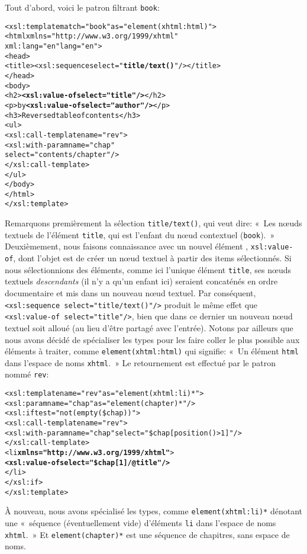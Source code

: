 \noindent Tout d'abord, voici le patron filtrant \texttt{book}:
\begin{alltt}
\small  <xsl:template match="book" as="element(xhtml:html)">
    <html xmlns="http://www.w3.org/1999/xhtml"
          xml:lang="en" lang="en">
      <head>
        <title><xsl:sequence select="\textbf{title/text()}"/></title>
      </head>
      <body>
        <h2>\textbf{<xsl:value-of select="title"/>}</h2>
        <p>by \textbf{<xsl:value-of select="author"/>}</p>
        <h3>Reversed table of contents</h3>
        <ul>
          <xsl:call-template name="rev">
            <xsl:with-param name="chap"
                            select="contents/chapter"/>
          </xsl:call-template>
        </ul>
      </body>
    </html>
  </xsl:template>
\end{alltt}
Remarquons premièrement la sélection \texttt{title/text()}, qui veut
dire: «~Les n{\oe}uds textuels de l'élément \texttt{title}, qui est
l'enfant du n{\oe}ud contextuel (\texttt{book}).~» Deuxièmement, nous
faisons connaissance avec un nouvel élément \XSLT,
\texttt{xsl:value-of}, dont l'objet est de créer un n{\oe}ud textuel à
partir des items sélectionnés. Si nous sélectionnions des éléments,
comme ici l'unique élément \texttt{title}, ses n{\oe}uds textuels
\emph{descendants} (il n'y a qu'un enfant ici) seraient concaténés en
ordre documentaire et mis dans un nouveau n{\oe}ud textuel. Par
conséquent, \texttt{<xsl:sequence select="title/text()"/>} produit le
même effet que \texttt{<xsl:value-of select="title"/>}, bien que dans
ce dernier un nouveau n{\oe}ud textuel soit alloué (au lieu d'être
partagé avec l'entrée). Notons par ailleurs que nous avons décidé de
spécialiser les types pour les faire coller le plus possible aux
éléments à traiter, comme \texttt{element(xhtml:html)} qui signifie:
«~Un élément \texttt{html} dans l'espace de noms \texttt{xhtml}.~» Le
retournement est effectué par le patron nommé \texttt{rev}:
\begin{alltt}
\small  <xsl:template name="rev" as="element(xhtml:li)*">
    <xsl:param name="chap" as="element(chapter)*"/>
    <xsl:if test="not(empty(\$chap))">
      <xsl:call-template name="rev">
        <xsl:with-param name="chap"\!\! select="\$chap[position()>1]"/>
      </xsl:call-template>
      <li \textbf{xmlns="http://www.w3.org/1999/xhtml"}>
        \textbf{<xsl:value-of select="\$chap[1]/@title"/>}
      </li>
    </xsl:if>
  </xsl:template>
\end{alltt}
À nouveau, nous avons spécialisé les types, comme
\texttt{element(xhtml:li)*} dénotant une «~séquence (éventuellement
vide) d'éléments \texttt{li} dans l'espace de noms \texttt{xhtml}.~» Et
\texttt{element(chapter)*} est une séquence de chapitres, sans espace
de noms.

